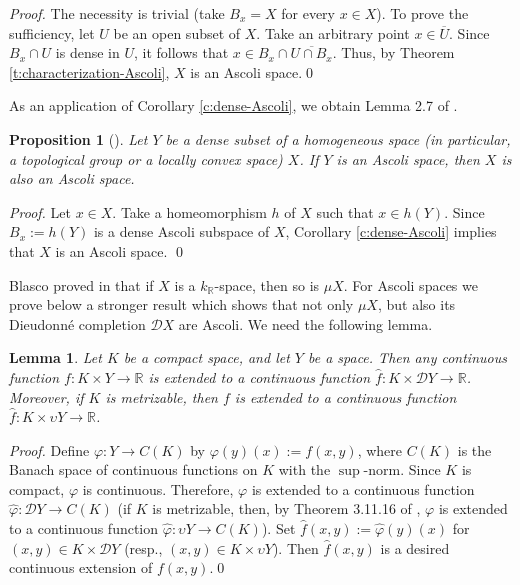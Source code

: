 \documentclass[preprint,11pt]{elsarticle}
\newtheorem{lemma}[theorem]{Lemma}
\newtheorem{proposition}[theorem]{Proposition}
\numberwithin{equation}{section}
\numberwithin{theorem}{section}
\newcommand{\IR}{\mathbb{R}}
\newcommand{\DD}{\mathcal{D}}
\begin{document}
\begin{proof}
The necessity is trivial (take $B_x=X$ for every $x\in X$). To prove the sufficiency, let $U$ be an open subset of $X$. Take an arbitrary point $x\in \overline{U}$. Since $B_x\cap U$ is dense in $U$, it follows that $x\in B_x\cap \overline{U\cap B_x}$. Thus, by Theorem \ref{t:characterization-Ascoli}, $X$ is an Ascoli space.\qed
\end{proof}

As an application of Corollary \ref{c:dense-Ascoli}, we obtain Lemma 2.7 of \cite{GGKZ}.
\begin{proposition}[\cite{GGKZ}] \label{p:dense-Ascoli}
Let $Y$ be a dense subset of a homogeneous space (in particular, a topological group or a locally convex space) $X$. If $Y$ is an Ascoli space, then $X$ is also an Ascoli space.
\end{proposition}
\begin{proof}
Let $x\in X$. Take a homeomorphism $h$ of $X$ such that $x\in h(Y)$. Since $B_x:=h(Y)$ is a dense Ascoli subspace of $X$, Corollary \ref{c:dense-Ascoli} implies that $X$ is an Ascoli space. \qed
\end{proof}



Blasco proved in \cite{Blasco-77} that if $X$ is a $k_\IR$-space, then so is $\mu X$. For Ascoli spaces we prove below a stronger result which shows that not only $\mu X$, but also its  Dieudonn\'{e} completion $\DD X$   are Ascoli. We need the following lemma.


\begin{lemma} \label{l:ext-prod-comp}
Let $K$ be a compact space, and let $Y$ be a space. Then any continuous function $f: K\times Y\to\IR$ is extended to a continuous function $\hat f: K\times \DD Y\to\IR$. Moreover, if $K$ is metrizable, then $f$ is extended to a continuous function  $\hat f: K\times \upsilon Y\to\IR$.
\end{lemma}

\begin{proof}
Define $\varphi: Y\to C(K)$ by  $\varphi(y)(x):=f(x,y)$, where $C(K)$ is the Banach space of continuous functions on $K$ with the $\sup$-norm. Since $K$ is compact, $\varphi$ is continuous. Therefore, $\varphi$  is extended to a continuous function $\hat\varphi: \DD Y\to C(K)$  (if $K$ is metrizable, then, by Theorem 3.11.16 of \cite{Eng},  $\varphi$  is extended to a continuous function $\hat\varphi: \upsilon Y\to C(K)$).
Set $\hat f(x,y):=\hat\varphi(y)(x)$ for $(x,y)\in K\times \DD Y$ (resp., $(x,y)\in K\times \upsilon Y$). Then $\hat f(x,y)$ is a desired continuous extension of $f(x,y)$.\qed
\end{proof}
\end{document}
